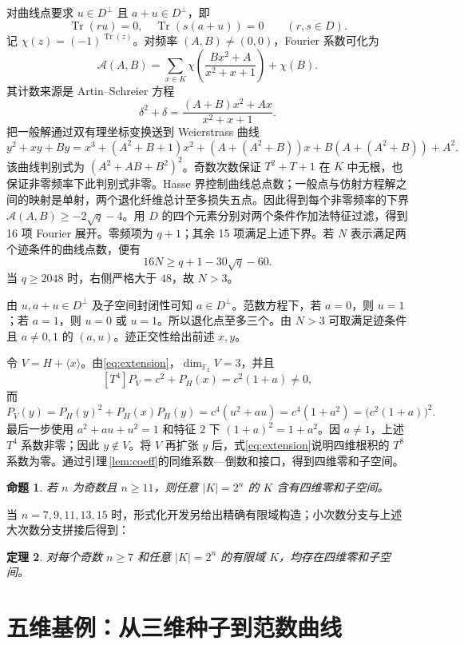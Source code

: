 \documentclass[UTF8,a4paper,11pt]{ctexart}
\numberwithin{equation}{section}
\newtheorem{theorem}{定理}[section]
\newtheorem{proposition}[theorem]{命题}
\theoremstyle{definition}
\theoremstyle{remark}
\newcommand{\Ftwo}{\mathbb F_2}
\newcommand{\tr}{\operatorname{Tr}}
\newcommand{\dimf}{\dim_{\Ftwo}}
\begin{document}
对曲线点要求 $u\in D^\perp$ 且 $a+u\in D^\perp$，即
\[
 \tr(ru)=0,\quad\tr(s(a+u))=0\qquad(r,s\in D).
\]
记 $\chi(z)=(-1)^{\tr(z)}$。对频率 $(A,B)\ne(0,0)$，Fourier 系数可化为
\[
 \mathcal A(A,B)=\sum_{x\in K}\chi\!\left(\frac{Bx^2+A}{x^2+x+1}\right)+\chi(B).
\]
其计数来源是 Artin--Schreier 方程
\[
 \delta^2+\delta=\frac{(A+B)x^2+Ax}{x^2+x+1}.
\]
把一般解通过双有理坐标变换送到 Weierstrass 曲线
\[
 y^2+xy+By=x^3+(A^2+B+1)x^2+(A+(A^2+B))x+B(A+(A^2+B))+A^2.
\]
该曲线判别式为 $(A^2+AB+B^2)^2$。奇数次数保证 $T^2+T+1$ 在 $K$ 中无根，也保证非零频率下此判别式非零。Hasse 界控制曲线总点数；一般点与仿射方程解之间的映射是单射，两个退化纤维总计至多损失五点。因此得到每个非零频率的下界 $\mathcal A(A,B)\ge-2\sqrt q-4$。用 $D$ 的四个元素分别对两个条件作加法特征过滤，得到 16 项 Fourier 展开。零频项为 $q+1$；其余 15 项满足上述下界。若 $N$ 表示满足两个迹条件的曲线点数，便有
\begin{equation}\label{eq:k4count}
 16N\ge q+1-30\sqrt q-60.
\end{equation}
当 $q\ge2048$ 时，右侧严格大于 $48$，故 $N>3$。

由 $u,a+u\in D^\perp$ 及子空间封闭性可知 $a\in D^\perp$。范数方程下，若 $a=0$，则 $u=1$；若 $a=1$，则 $u=0$ 或 $u=1$。所以退化点至多三个。由 $N>3$ 可取满足迹条件且 $a\ne0,1$ 的 $(a,u)$。迹正交性给出前述 $x,y$。

令 $V=H+\langle x\rangle$。由\eqref{eq:extension}，$\dimf V=3$，并且
\[
 [T^4]P_V=c^2+P_H(x)=c^2(1+a)\ne0,
\]
而
\[
 P_V(y)=P_H(y)^2+P_H(x)P_H(y)
       =c^4(u^2+au)=c^4(1+a^2)=\bigl(c^2(1+a)\bigr)^2.
\]
最后一步使用 $a^2+au+u^2=1$ 和特征 $2$ 下 $(1+a)^2=1+a^2$。因 $a\ne1$，上述 $T^4$ 系数非零；因此 $y\notin V$。将 $V$ 再扩张 $y$ 后，式\eqref{eq:extension}说明四维根积的 $T^8$ 系数为零。通过引理\,\ref{lem:coeff}的同维系数—倒数和接口，得到四维零和子空间。

\begin{proposition}\label{prop:k4large}
若 $n$ 为奇数且 $n\ge11$，则任意 $|K|=2^n$ 的 $K$ 含有四维零和子空间。
\end{proposition}

当 $n=7,9,11,13,15$ 时，形式化开发另给出精确有限域构造；小次数分支与上述大次数分支拼接后得到：
\begin{theorem}\label{thm:k4}
对每个奇数 $n\ge7$ 和任意 $|K|=2^n$ 的有限域 $K$，均存在四维零和子空间。
\end{theorem}

\section{五维基例：从三维种子到范数曲线}
\end{document}
